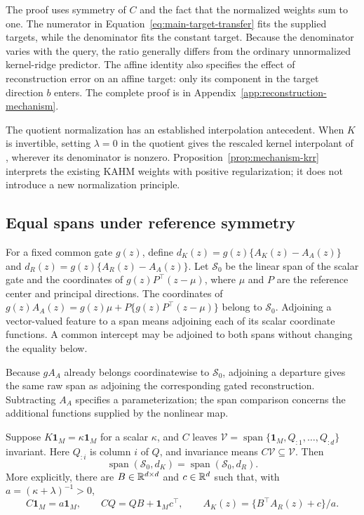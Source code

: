 The proof uses symmetry of $C$ and the fact that the normalized weights
sum to one. The numerator in Equation~\eqref{eq:main-target-transfer}
fits the supplied targets, while the denominator fits the constant
target. Because the denominator varies with the query, the ratio
generally differs from the ordinary unnormalized kernel-ridge predictor.
The affine identity also specifies the effect of reconstruction error on
an affine target: only its component in the target direction $b$ enters.
The complete proof is in Appendix~\ref{app:reconstruction-mechanism}.

The quotient normalization has an established interpolation antecedent.
When $K$ is invertible, setting $\lambda=0$ in the quotient gives the
rescaled kernel interpolant of \citet{DeMarchi2017Rescaled}, wherever
its denominator is nonzero. Proposition~\ref{prop:mechanism-krr}
interprets the existing KAHM weights with positive regularization;
it does not introduce a new normalization principle.

\subsection{Equal spans under reference symmetry}

For a fixed common gate $g(z)$, define
$d_K(z)=g(z)\{A_K(z)-A_A(z)\}$ and
$d_R(z)=g(z)\{A_R(z)-A_A(z)\}$. Let $\mathcal S_0$ be the linear
span of the scalar gate and the coordinates of
$g(z)P^\top(z-\mu)$, where $\mu$ and $P$ are the reference center
and principal directions. The coordinates of
$g(z)A_A(z)=g(z)\mu+P\{g(z)P^\top(z-\mu)\}$ belong to
$\mathcal S_0$. Adjoining a vector-valued feature to a span means
adjoining each of its scalar coordinate functions. A common intercept
may be adjoined to both spans without changing the equality below.

Because $gA_A$ already belongs coordinatewise to $\mathcal S_0$,
adjoining a departure gives the same raw span as adjoining the
corresponding gated reconstruction. Subtracting $A_A$ specifies a
parameterization; the span comparison concerns the additional functions
supplied by the nonlinear map.

\begin{proposition}
\label{prop:mechanism-redundancy}
Suppose $K\mathbf1_M=\kappa\mathbf1_M$ for a scalar $\kappa$, and
$C$ leaves
$\mathcal V=\operatorname{span}\{\mathbf1_M,Q_{:1},\ldots,Q_{:d}\}$
invariant. Here $Q_{:i}$ is column $i$ of $Q$, and invariance means
$C\mathcal V\subseteq\mathcal V$. Then
\[
 \operatorname{span}(\mathcal S_0,d_K)
 =\operatorname{span}(\mathcal S_0,d_R).
\]
More explicitly, there are $B\in\mathbb{R}^{d\times d}$ and $c\in\mathbb{R}^d$
such that, with $a=(\kappa+\lambda)^{-1}>0$,
\[
 C\mathbf1_M=a\mathbf1_M,\qquad
 CQ=QB+\mathbf1_Mc^\top,\qquad
 A_K(z)=\{B^\top A_R(z)+c\}/a.
\]
\end{proposition}

